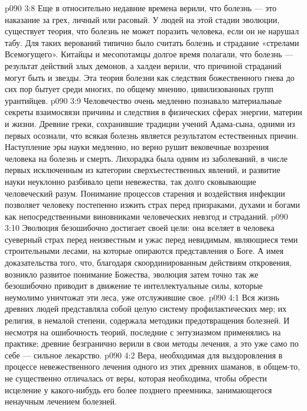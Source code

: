\vs p090 3:8 \bibnobreakspace {} Еще в относительно недавние времена верили, что болезнь --- это наказание за грех, личный или расовый. У людей на этой стадии эволюции, существует теория, что болезнь не может поразить человека, если он не нарушал табу. Для таких верований типично было считать болезнь и страдание «стрелами Всемогущего». Китайцы и месопотамцы долгое время полагали, что болезнь --- результат действий злых демонов, а халдеи верили, что причиной страданий могут быть и звезды. Эта теория болезни как следствия божественного гнева до сих пор бытует среди многих, по общему мнению, цивилизованных групп урантийцев.
\vs p090 3:9 \bibnobreakspace {} Человечество очень медленно познавало материальные секреты взаимосвязи причины и следствия в физических сферах энергии, материи и жизни. Древние греки, сохранившие традиции учений Адама\hyp{}сына, одними из первых осознали, что всякая болезнь является результатом естественных причин. Наступление эры науки медленно, но верно рушит вековечные воззрения человека на болезнь и смерть. Лихорадка была одним из заболеваний, в числе первых исключенным из категории сверхъестественных явлений, и развитие науки неуклонно разбивало цепи невежества, так долго сковывающие человеческий разум. Понимание процессов старения и воздействия инфекции позволяет человеку постепенно изжить страх перед призраками, духами и богами как непосредственными виновниками человеческих невзгод и страданий.
\vs p090 3:10 \pc Эволюция безошибочно достигает своей цели: она вселяет в человека суеверный страх перед неизвестным и ужас перед невидимым, являющиеся теми строительными лесами, на которые опираются представления о Боге. А имея доказательства того, что, благодаря скоординированным действиям откровения, возникло развитое понимание Божества, эволюция затем точно так же безошибочно приводит в движение те интеллектуальные силы, которые неумолимо уничтожат эти леса, уже отслужившие свое.
\vs p090 4:1 Вся жизнь древних людей представляла собой целую систему профилактических мер; их религия, в немалой степени, содержала методики предотвращения болезней. И несмотря на ошибочность теорий, последние с энтузиазмом применялись на практике; древние безгранично верили в свои методы лечения, а это уже само по себе --- сильное лекарство.
\vs p090 4:2 \pc Вера, необходимая для выздоровления в процессе невежественного лечения одного из этих древних шаманов, в общем\hyp{}то, не существенно отличалась от веры, которая необходима, чтобы обрести исцеление у какого\hyp{}нибудь его более позднего преемника, занимающегося ненаучным лечением болезней.
